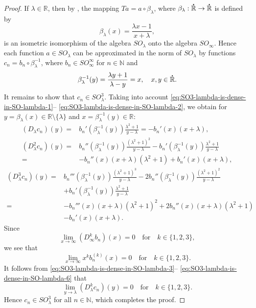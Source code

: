 \documentclass{birkjour}
\numberwithin{equation}{section}
\newcommand{\N}{\mathbb{N}}
\newcommand{\R}{\mathbb{R}}
\newcommand{\dR}{{\bf\dot{\R}}}
\begin{document}
\begin{proof}
If $\lambda\in\R$, then by \cite[Corollary~2.2]{KILH13a}, the mapping
$Ta=a\circ\beta_\lambda$, where $\beta_\lambda:\dR\to\dR$ is defined by
\begin{equation}\label{eq:SO3-lambda-is-dense-in-SO-lambda-1}
\beta_\lambda(x)=\frac{\lambda x-1}{x+\lambda},
\end{equation}
is an isometric isomorphism of the algebra $SO_\lambda$ onto the algebra
$SO_\infty$. Hence each function $a\in SO_\lambda$ can be approximated in
the norm of $SO_\lambda$ by functions $c_n=b_n\circ\beta_\lambda^{-1}$, where
$b_n\in SO_\infty^\infty$ for $n\in\N$ and
\begin{equation}\label{eq:SO3-lambda-is-dense-in-SO-lambda-2}
\beta_\lambda^{-1}(y)=\frac{\lambda y+1}{\lambda-y}=x,
\quad x,y\in\dR.
\end{equation}
It remains to show that $c_n\in SO_\lambda^3$. Taking into account
\eqref{eq:SO3-lambda-is-dense-in-SO-lambda-1}--%
\eqref{eq:SO3-lambda-is-dense-in-SO-lambda-2}, we obtain for
$y=\beta_\lambda(x)\in\R\setminus\{\lambda\}$ and
$x=\beta_\lambda^{-1}(y)\in\R$:
\begin{align}
(D_\lambda c_n)(y)
=&
b_n'\left(\beta_\lambda^{-1}(y)\right)\frac{\lambda^2+1}{y-\lambda}
=
-b_n'(x)(x+\lambda),
\label{eq:SO3-lambda-is-dense-in-SO-lambda-3}
\\
(D_\lambda^2c_n)(y)
=&
b_n''\left(\beta_\lambda^{-1}(y)\right)\frac{(\lambda^2+1)^2}{y-\lambda}
-
b_n'\left(\beta_\lambda^{-1}(y)\right)\frac{\lambda^2+1}{y-\lambda}
\nonumber
\\
=&
-b_n''(x)(x+\lambda)(\lambda^2+1)
+b_n'(x)(x+\lambda),
\label{eq:SO3-lambda-is-dense-in-SO-lambda-4}
\end{align}
\begin{align}
(D_\lambda^3c_n)(y)
=&
b_n'''\left(\beta_\lambda^{-1}(y)\right)\frac{(\lambda^2+1)^3}{y-\lambda}
-
2b_n''\left(\beta_\lambda^{-1}(y)\right)\frac{(\lambda^2+1)^2}{y-\lambda}
\nonumber
\\
&+
b_n'\left(\beta_\lambda^{-1}(y)\right)\frac{\lambda^2+1}{y-\lambda}
\nonumber
\\
=&
-b_n'''(x)(x+\lambda)(\lambda^2+1)^2
+2b_n''(x)(x+\lambda)(\lambda^2+1)
\nonumber
\\
&-b_n'(x)(x+\lambda).
\label{eq:SO3-lambda-is-dense-in-SO-lambda-5}
\end{align}
Since
\[
\lim_{x\to\infty}(D_\infty^kb_n)(x)=0
\quad\mbox{for}\quad
k\in\{1,2,3\},
\]
we see that
\begin{equation}\label{eq:SO3-lambda-is-dense-in-SO-lambda-6}
\lim_{x\to\infty}x^kb_n^{(k)}(x)=0
\quad\mbox{for}\quad
k\in\{1,2,3\}.
\end{equation}
It follows from \eqref{eq:SO3-lambda-is-dense-in-SO-lambda-3}--%
\eqref{eq:SO3-lambda-is-dense-in-SO-lambda-6} that
\[
\lim_{y\to\lambda}(D_\lambda^kc_n)(y)=0
\quad\mbox{for}\quad
k\in\{1,2,3\}.
\]
Hence $c_n\in SO_\lambda^3$ for all $n\in\N$, which completes the proof.
\end{proof}
\end{document}

